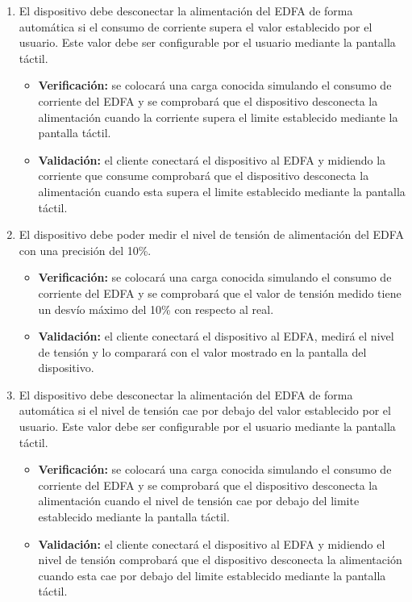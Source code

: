 \documentclass[
11pt, %
]{charter}
\begin{document}
\begin{enumerate}
\begin{enumerate}
\begin{enumerate}[label*=\arabic*.]
\item El dispositivo debe desconectar la alimentación del EDFA de forma automática si el consumo de corriente supera el valor establecido por el usuario. Este valor debe ser configurable por el usuario mediante la pantalla táctil.
\begin{itemize}
	\item \textbf{Verificación:} se colocará una carga conocida simulando el consumo de corriente del EDFA y se comprobará que el dispositivo desconecta la alimentación cuando la corriente supera el limite establecido mediante la pantalla táctil.
	\item \textbf{Validación:} el cliente conectará el dispositivo al EDFA y midiendo la corriente que consume comprobará que el dispositivo desconecta la alimentación cuando esta supera el limite establecido mediante la pantalla táctil.
\end{itemize}

\item El dispositivo debe poder medir el nivel de tensión de alimentación del EDFA con una precisión del 10\%.
\begin{itemize}
	\item \textbf{Verificación:} se colocará una carga conocida simulando el consumo de corriente del EDFA y se comprobará que el valor de tensión medido tiene un desvío máximo del 10\% con respecto al real.
	\item \textbf{Validación:} el cliente conectará el dispositivo al EDFA, medirá el nivel de tensión y lo comparará con el valor mostrado en la pantalla del dispositivo.
\end{itemize}

\item El dispositivo debe desconectar la alimentación del EDFA de forma automática si el nivel de tensión cae por debajo del valor establecido por el usuario. Este valor debe ser configurable por el usuario mediante la pantalla táctil.
\begin{itemize}
	\item \textbf{Verificación:} se colocará una carga conocida simulando el consumo de corriente del EDFA y se comprobará que el dispositivo desconecta la alimentación cuando el nivel de tensión cae por debajo del limite establecido mediante la pantalla táctil.
	\item \textbf{Validación:} el cliente conectará el dispositivo al EDFA y midiendo el nivel de tensión comprobará que el dispositivo desconecta la alimentación cuando esta cae por debajo del limite establecido mediante la pantalla táctil.
\end{itemize}


\end{enumerate}
\end{enumerate}
\end{enumerate}
\end{document}
